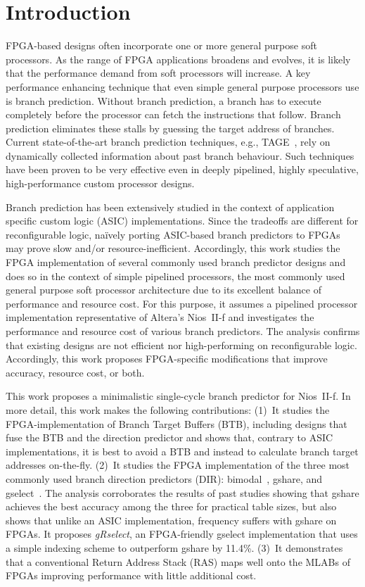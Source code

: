 \chapter{Introduction}
\label{chap:introduction}
FPGA-based designs often incorporate one or more general purpose soft processors. As the range of FPGA applications broadens and evolves, it is likely that the performance demand from soft processors will increase. A key performance enhancing technique that even simple general purpose processors use is branch prediction. Without branch prediction, a branch has to execute completely before the processor can fetch the instructions that follow. Branch prediction eliminates these stalls by guessing the target address of branches. Current state-of-the-art branch prediction techniques, e.g., TAGE~\cite{tage}, rely on dynamically collected information about past branch behaviour. Such techniques have been proven to be very effective even in deeply pipelined, highly speculative, high-performance custom processor designs.

Branch prediction has been extensively studied in the context of application specific custom logic (ASIC) implementations. Since the tradeoffs are different for reconfigurable logic, na\"ively porting ASIC-based branch predictors to FPGAs may prove slow and/or resource-inefficient. Accordingly, this work studies the FPGA implementation of several commonly used branch predictor designs and does so in the context of simple pipelined processors, the most commonly used general purpose soft processor architecture due to its excellent balance of performance  and resource cost. For this purpose, it assumes a pipelined processor implementation representative of Altera's Nios~II-f and investigates the performance and resource cost of various branch predictors. The analysis confirms that existing designs are not efficient nor high-performing on reconfigurable logic. Accordingly, this work proposes FPGA-specific modifications that improve accuracy, resource cost, or both.

This work proposes a minimalistic single-cycle branch predictor for Nios~II-f. In more detail, this work makes the following contributions:
(1)~It studies the FPGA-implementation of Branch Target Buffers (BTB), including designs that fuse the BTB and the direction predictor and shows that, contrary to ASIC implementations, it is best to avoid a BTB and instead to calculate branch target addresses on-the-fly.
(2)~It studies the FPGA implementation of the three most commonly used branch direction predictors (DIR): bimodal~\cite{bimodal}, gshare, and gselect~\cite{McFarling}. The analysis corroborates the results of past studies showing that gshare achieves the best accuracy among the three for practical table sizes, but also shows that unlike an ASIC implementation, frequency suffers with gshare on FPGAs. It proposes \textit{gRselect}, an FPGA-friendly gselect implementation that uses a simple indexing scheme to outperform gshare by 11.4\%.
(3)~It demonstrates that a conventional Return Address Stack (RAS) maps well onto the MLABs of FPGAs improving performance with little additional cost.


